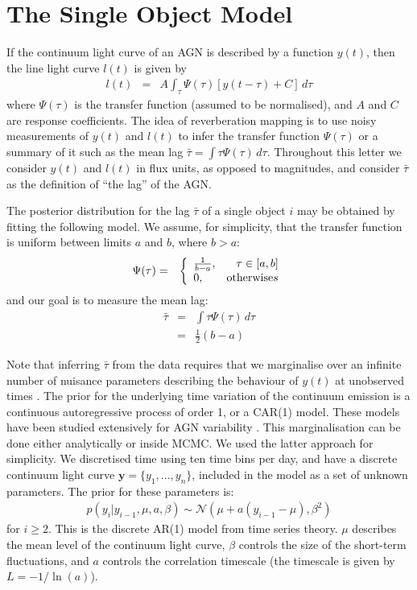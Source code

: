 \documentclass[useAMS,usenatbib]{mn2e}
\begin{document}
\section{The Single Object Model}\label{sec:single_object}
If the continuum light curve of an AGN
is described by a function $y(t)$, then the line
light curve $l(t)$ is given by
\begin{eqnarray}
l(t) &=& A \int_\tau \Psi(\tau)\left[y(t - \tau) + C\right] \, d\tau
\end{eqnarray}
where $\Psi(\tau)$ is the transfer function (assumed to be normalised),
and $A$ and $C$ are response
coefficients. The idea of reverberation mapping is to use noisy measurements
of $y(t)$ and $l(t)$ to infer the transfer function $\Psi(\tau)$ or a summary
of it such as the mean lag $\bar{\tau} = \int \tau\Psi(\tau) \, d\tau$.
Throughout this letter we consider $y(t)$ and $l(t)$ in flux
units, as opposed to magnitudes, and consider $\bar{\tau}$ as
the definition of ``the lag'' of the AGN.

The posterior distribution for the lag $\bar{\tau}$ of a single object
$i$ may be obtained
by fitting the following model. We assume, for simplicity, that
the transfer function is uniform
between limits $a$ and $b$, where $b > a$:
\begin{eqnarray}
\Psi(\tau) &=& \left\{
\begin{array}{lr}
\frac{1}{b-a}, & \tau \in [a,b]\\
0, & \textnormal{otherwise}s
\end{array}\right.
\end{eqnarray}
and our goal is to measure the mean lag:
\begin{eqnarray}
\bar{\tau} &=& \int \tau \Psi(\tau) \, d\tau\\
&=& \frac{1}{2}(b-a)
\end{eqnarray}

Note that inferring $\bar{\tau}$ from the data requires that we
marginalise over an infinite number of nuisance parameters describing the
behaviour of $y(t)$ at unobserved times \citep{pancoast}.
The prior for the underlying time variation of the continuum emission is
a continuous autoregressive process of order 1, or a CAR(1) model. These models
have been studied extensively for AGN variability
\citep[e.g.][]{2009ApJ...698..895K, 2011ApJ...735...80Z, 2013ApJ...765..106Z}.
This marginalisation can be done
either analytically or inside MCMC. We used the latter approach for simplicity.
We discretised
time using ten time bins per day, and have a discrete continuum light curve
$\mathbf{y} = \{y_1, ..., y_n\}$, included in the model as a set of unknown
parameters. The prior for these parameters is:
\begin{eqnarray}
p(y_i | y_{i-1},  \mu, a, \beta) \sim \mathcal{N}
\left(\mu + a\left(y_{i-1} - \mu\right), \beta^2\right)
\end{eqnarray}
for $i \geq 2$. This is the discrete AR(1) model from time series theory.
$\mu$ describes the mean level of the continuum light curve, $\beta$ controls
the size of the short-term fluctuations, and $a$ controls the correlation
timescale (the timescale is given by $L = -1/\ln(a)$).
\end{document}
